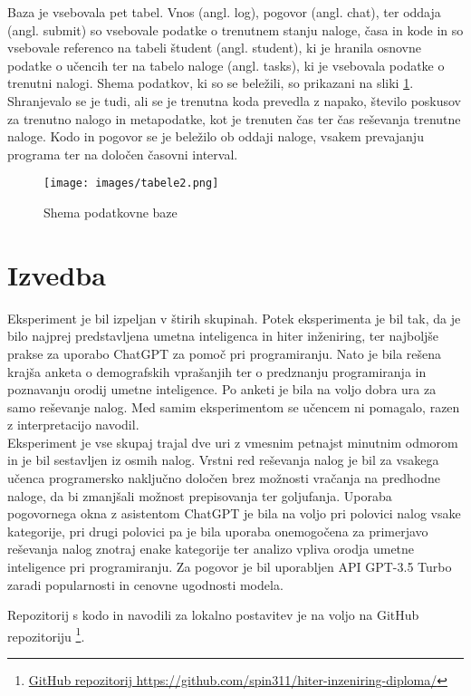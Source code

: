 \documentclass[a4paper,12pt,openright]{book}
\begin{document}
Baza je vsebovala pet tabel. Vnos (angl. log), pogovor (angl. chat), ter oddaja (angl. submit) so vsebovale podatke o trenutnem stanju naloge, časa in kode in so vsebovale referenco na tabeli študent (angl. student), ki je hranila osnovne podatke o učencih ter na tabelo naloge (angl. tasks), ki je vsebovala podatke o trenutni nalogi. Shema podatkov, ki so se beležili, so prikazani na sliki \ref{fig:baze}. \\ 
Shranjevalo se je tudi, ali se je trenutna koda prevedla z napako, število poskusov za trenutno nalogo in metapodatke, kot je trenuten čas ter čas reševanja trenutne naloge. Kodo in pogovor se je beležilo ob oddaji naloge, vsakem prevajanju programa ter na določen časovni interval.

\begin{figure}[H]
    \centering
    \texttt{[image: images/tabele2.png]}
    \caption{Shema podatkovne baze}
    \label{fig:baze}
\end{figure}


\section{Izvedba}

Eksperiment je bil izpeljan v štirih skupinah. Potek eksperimenta je bil tak, da je bilo najprej predstavljena umetna inteligenca in hiter inženiring, ter najboljše prakse za uporabo ChatGPT za pomoč pri programiranju. Nato je bila rešena krajša anketa o demografskih vprašanjih ter o predznanju programiranja in poznavanju orodij umetne inteligence. Po anketi je bila na voljo dobra ura za samo reševanje nalog. Med samim eksperimentom se učencem ni pomagalo, razen z interpretacijo navodil. \\
Eksperiment je vse skupaj trajal dve uri z vmesnim petnajst minutnim odmorom in je bil sestavljen iz osmih nalog. Vrstni red reševanja nalog je bil za vsakega učenca programersko naključno določen brez možnosti vračanja na predhodne naloge, da bi zmanjšali možnost prepisovanja ter goljufanja. Uporaba pogovornega okna z asistentom ChatGPT je bila na voljo pri polovici nalog vsake kategorije, pri drugi polovici pa je bila uporaba onemogočena za primerjavo reševanja nalog znotraj enake kategorije ter analizo vpliva orodja umetne inteligence pri programiranju. Za pogovor je bil uporabljen API GPT-3.5 Turbo zaradi popularnosti in cenovne ugodnosti modela.

Repozitorij s kodo in navodili za lokalno postavitev je na voljo na GitHub repozitoriju \footnote{\href{https://github.com/spin311/hiter-inzeniring-diploma/}{GitHub repozitorij https://github.com/spin311/hiter-inzeniring-diploma/}}.
\end{document}
